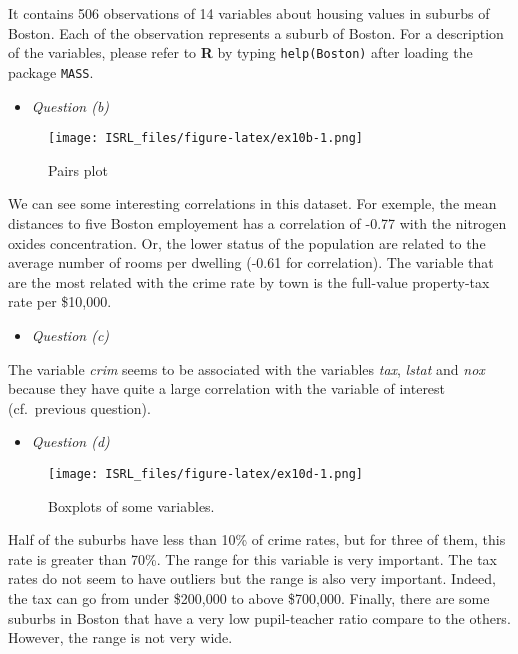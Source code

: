 \documentclass[]{book}
\providecommand{\tightlist}{%
  \setlength{\itemsep}{0pt}\setlength{\parskip}{0pt}}
\begin{document}
It contains 506 observations of 14 variables about housing values in suburbs of Boston. Each of the observation represents a suburb of Boston. For a description of the variables, please refer to \textbf{R} by typing \texttt{help(Boston)} after loading the package \texttt{MASS}.

\begin{itemize}
\tightlist
\item
  \emph{Question (b)}
\end{itemize}

\begin{figure}
\centering
\texttt{[image: ISRL\_files/figure-latex/ex10b-1.png]}
\caption{\label{fig:ex10b}Pairs plot}
\end{figure}

We can see some interesting correlations in this dataset. For exemple, the mean distances to five Boston employement has a correlation of -0.77 with the nitrogen oxides concentration. Or, the lower status of the population are related to the average number of rooms per dwelling (-0.61 for correlation). The variable that are the most related with the crime rate by town is the full-value property-tax rate per \$10,000.

\begin{itemize}
\tightlist
\item
  \emph{Question (c)}
\end{itemize}

The variable \emph{crim} seems to be associated with the variables \emph{tax}, \emph{lstat} and \emph{nox} because they have quite a large correlation with the variable of interest (cf.~previous question).

\begin{itemize}
\tightlist
\item
  \emph{Question (d)}
\end{itemize}

\begin{figure}
\centering
\texttt{[image: ISRL\_files/figure-latex/ex10d-1.png]}
\caption{\label{fig:ex10d}Boxplots of some variables.}
\end{figure}

Half of the suburbs have less than 10\% of crime rates, but for three of them, this rate is greater than 70\%. The range for this variable is very important. The tax rates do not seem to have outliers but the range is also very important. Indeed, the tax can go from under \$200,000 to above \$700,000. Finally, there are some suburbs in Boston that have a very low pupil-teacher ratio compare to the others. However, the range is not very wide.
\end{document}
